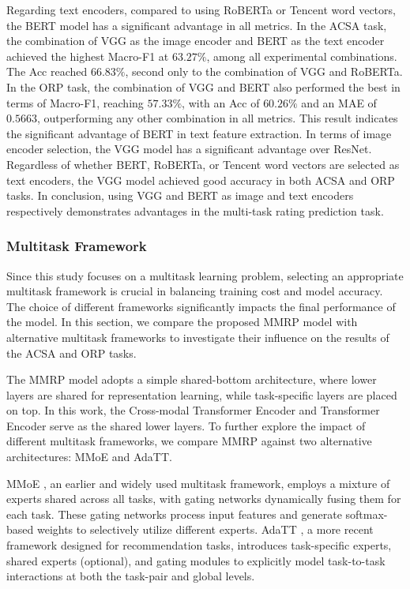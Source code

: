 \documentclass[preprint,12pt]{elsarticle}
\begin{document}
Regarding text encoders, compared to using RoBERTa or Tencent word vectors, the BERT model has a significant advantage in all metrics. In the ACSA task, the combination of VGG as the image encoder and BERT as the text encoder achieved the highest Macro-F1 at $63.27\%$, among all experimental combinations. The Acc reached $66.83\%$, second only to the combination of VGG and RoBERTa. In the ORP task, the combination of VGG and BERT also performed the best in terms of Macro-F1, reaching $57.33\%$, with an Acc of $60.26\%$ and an MAE of $0.5663$, outperforming any other combination in all metrics. This result indicates the significant advantage of BERT in text feature extraction. In terms of image encoder selection, the VGG model has a significant advantage over ResNet. Regardless of whether BERT, RoBERTa, or Tencent word vectors are selected as text encoders, the VGG model achieved good accuracy in both ACSA and ORP tasks. In conclusion, using VGG and BERT as image and text encoders respectively demonstrates advantages in the multi-task rating prediction task.

\subsubsection{Multitask Framework}

Since this study focuses on a multitask learning problem, selecting an appropriate multitask framework is crucial in balancing training cost and model accuracy. The choice of different frameworks significantly impacts the final performance of the model. In this section, we compare the proposed MMRP model with alternative multitask frameworks to investigate their influence on the results of the ACSA and ORP tasks.

The MMRP model adopts a simple shared-bottom architecture, where lower layers are shared for representation learning, while task-specific layers are placed on top. In this work, the Cross-modal Transformer Encoder and Transformer Encoder serve as the shared lower layers. To further explore the impact of different multitask frameworks, we compare MMRP against two alternative architectures: MMoE and AdaTT.

MMoE \citep{mmoe}, an earlier and widely used multitask framework, employs a mixture of experts shared across all tasks, with gating networks dynamically fusing them for each task. These gating networks process input features and generate softmax-based weights to selectively utilize different experts. AdaTT \citep{adatt}, a more recent framework designed for recommendation tasks, introduces task-specific experts, shared experts (optional), and gating modules to explicitly model task-to-task interactions at both the task-pair and global levels.
\end{document}
